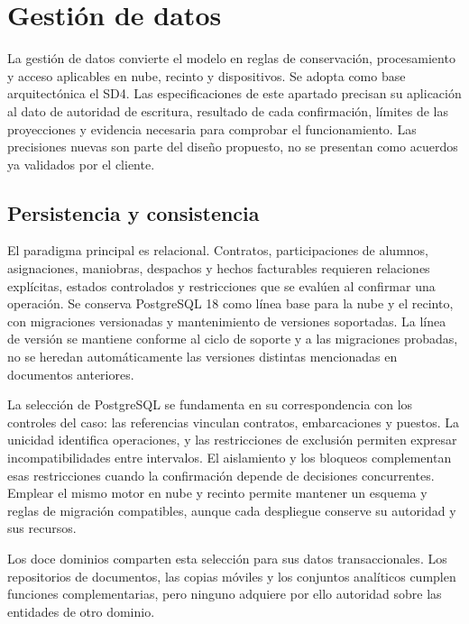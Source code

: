 \newpage
\section{Gestión de datos}
La gestión de datos convierte el modelo en reglas de conservación, procesamiento y acceso aplicables en nube, recinto y dispositivos. Se adopta como base arquitectónica el SD4. Las especificaciones de este apartado precisan su aplicación al dato de autoridad de escritura, resultado de cada confirmación, límites de las proyecciones y evidencia necesaria para comprobar el funcionamiento. Las precisiones nuevas son parte del diseño propuesto, no se presentan como acuerdos ya validados por el cliente.

\subsection{Persistencia y consistencia}
\label{subsec:sd5_persistencia}

El paradigma principal es relacional. Contratos, participaciones de alumnos, asignaciones, maniobras, despachos y hechos facturables requieren relaciones explícitas, estados controlados y restricciones que se evalúen al confirmar una operación. Se conserva PostgreSQL 18 como línea base para la nube y el recinto, con migraciones versionadas y mantenimiento de versiones soportadas. La línea de versión se mantiene conforme al ciclo de soporte y a las migraciones probadas, no se heredan automáticamente las versiones distintas mencionadas en documentos anteriores.

La selección de PostgreSQL se fundamenta en su correspondencia con los controles del caso: las referencias vinculan contratos, embarcaciones y puestos. La unicidad identifica operaciones, y las restricciones de exclusión permiten expresar incompatibilidades entre intervalos. El aislamiento y los bloqueos complementan esas restricciones cuando la confirmación depende de decisiones concurrentes. Emplear el mismo motor en nube y recinto permite mantener un esquema y reglas de migración compatibles, aunque cada despliegue conserve su autoridad y sus recursos.

Los doce dominios comparten esta selección para sus datos transaccionales. Los repositorios de documentos, las copias móviles y los conjuntos analíticos cumplen funciones complementarias, pero ninguno adquiere por ello autoridad sobre las entidades de otro dominio.

